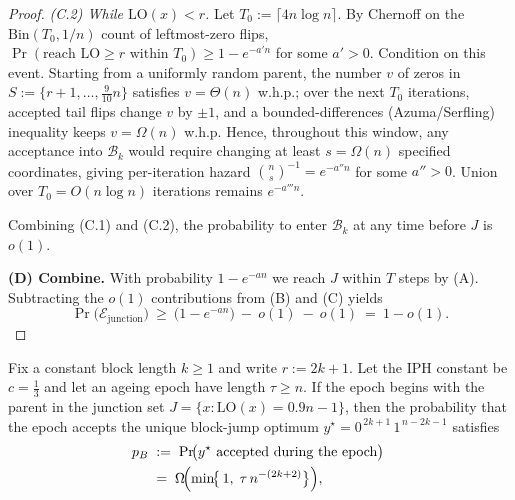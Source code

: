 \begin{proof}
	\emph{(C.2) While $\mathrm{LO}(x)< r$.}
	Let $T_0:=\lceil 4 n\log n\rceil$.  By Chernoff on the $\mathrm{Bin}(T_0,1/n)$ count of leftmost-zero
	flips, $\Pr(\text{reach }\mathrm{LO}\ge r\text{ within }T_0)\ge 1-e^{-a' n}$ for some $a'>0$.
	Condition on this event. Starting from a uniformly random parent, the number $v$ of zeros in
	$S:=\{r{+}1,\dots,\tfrac{9}{10}n\}$ satisfies $v=\Theta(n)$ w.h.p.; over the next $T_0$ iterations,
	accepted tail flips change $v$ by $\pm1$, and a bounded-differences (Azuma/Serfling) inequality keeps
	$v=\Omega(n)$ w.h.p.  Hence, throughout this window, any acceptance into $\mathcal{B}_k$ would require
	changing at least $s=\Omega(n)$ specified coordinates, giving per-iteration hazard
	$\binom{n}{s}^{-1}=e^{-a'' n}$ for some $a''>0$.  Union over $T_0=O(n\log n)$ iterations remains
	$e^{-a''' n}$.
	
	Combining (C.1) and (C.2), the probability to enter $\mathcal{B}_k$ at any time before $J$ is $o(1)$.
	
	\medskip\noindent
	\textbf{(D) Combine.}
	With probability $1-e^{-a n}$ we reach $J$ within $T$ steps by (A).  Subtracting the $o(1)$
	contributions from (B) and (C) yields
	\[
	\Pr\bigl(\mathcal{E}_{\mathrm{junction}}\bigr)
	\ \ge\
	\bigl(1-e^{-a n}\bigr)\ -\ o(1)\ -\ o(1)
	\ =\
	1-o(1).
	\]
\end{proof}



\begin{lemma}
	\label{lem:BJO-epoch}
	Fix a constant block length \(k\ge 1\) and write \(r:=2k+1\).
	Let the IPH constant be \(c=\tfrac13\) and let an ageing epoch have length
	\(\tau\ge n\).  
	If the epoch begins with the parent in the junction set
	\(J=\bigl\{x:\mathrm{LO}(x)=0.9n-1\bigr\}\),
	then the probability that the epoch accepts the unique block-jump optimum $y^{\star}=0^{\,2k+1}\,1^{\,n-2k-1}$ satisfies
	\begin{align*}
		p_B
		\;&:=\;
		\Pr\!\bigl(\text{$y^{\star}$ accepted during the epoch}\bigr)
		\;\\&=\;
		\Omega\!\Bigl(\min\!\bigl\{\,1,\;
		\tau\,n^{-(2k+2)}\bigr\}\Bigr),
	\end{align*}
\end{lemma}

